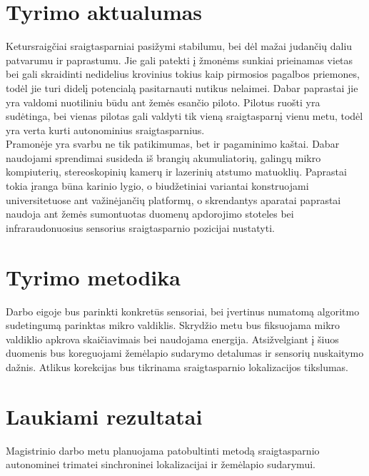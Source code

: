 \documentclass[a4paper, 12pt]{article} %
\begin{document}
\begin{onehalfspacing}
\section{Tyrimo aktualumas}
Ketursraig\v{c}iai sraigtasparniai pasi\v{z}ymi stabilumu, bei d\.el ma\v{z}ai
 judan\v{c}i\k{u} daliu patvarumu ir paprastumu. Jie gali patekti \k{i} \v{z}mon\.ems
  sunkiai prieinamas vietas bei gali skraidinti nedidelius krovinius tokius kaip pirmosios
   pagalbos priemones, tod\.el jie turi didel\k{i} potencial\k{a} pasitarnauti nutikus 
   nelaimei. Dabar paprastai jie yra valdomi nuotiliniu b\=udu ant \v{z}em\.es esan\v{c}io
    piloto. Pilotus ruo\v{s}ti yra sud\.etinga, bei vienas pilotas gali valdyti tik 
    vien\k{a} sraigtasparn\k{i} vienu metu, tod\.el yra verta kurti 
    autonominius sraigtasparnius.
\\
\indent Pramon\.eje yra svarbu ne tik patikimumas, bet ir pagaminimo ka\v{s}tai. Dabar naudojami sprendimai susideda i\v{s} brangi\k{u} akumuliatori\k{u}, galing\k{u} mikro kompiuteri\k{u}, stereoskopini\k{u} kamer\k{u} ir lazerini\k{u} atstumo matuokli\k{u}\cite{Nguyen2007}. Paprastai tokia \k{i}ranga b\=una karinio lygio, o biud\v{z}etiniai variantai konstruojami universitetuose ant va\v{z}in\.ejan\v{c}i\k{u} platform\k{u}\cite{Vincke2010a}\cite{Longchamp2010}, o skrendantys aparatai paprastai naudoja ant \v{z}em\.es sumontuotas duomen\k{u} apdorojimo stoteles bei infraraudonuosius sensorius sraigtasparnio pozicijai nustatyti. 

\section{Tyrimo metodika}

Darbo eigoje bus parinkti konkret\=us sensoriai, bei \k{i}vertinus numatom\k{a} algoritmo sudetingum\k{a} parinktas mikro valdiklis. Skryd\v{z}io metu bus fiksuojama mikro valdiklio apkrova skai\v{c}iavimais bei naudojama energija. Atsi\v{z}velgiant \k{i} \v{s}iuos duomenis bus koreguojami \v{z}em\.elapio sudarymo detalumas ir sensori\k{u} nuskaitymo da\v{z}nis. Atlikus korekcijas bus tikrinama sraigtasparnio lokalizacijos tikslumas.

\section{Laukiami rezultatai}

Magistrinio darbo metu planuojama patobultinti metod\k{a} sraigtasparnio autonominei trimatei sinchroninei lokalizacijai ir \v{z}em\.elapio sudarymui. 


\end{onehalfspacing}
\end{document}
